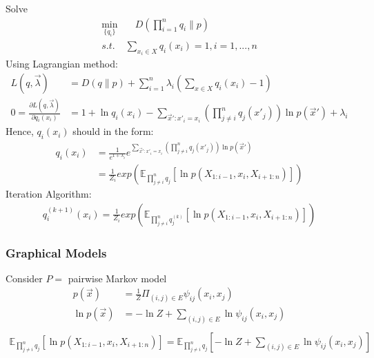 \documentclass[11pt,a4paper]{article}
\begin{document}
Solve 
\begin{equation}
    \begin{aligned}
        \min_{\{q_i\}}&\quad D(\prod_{i=1}^nq_i\| p)\\
        s.t.&\sum_{x_i\in X}q_i(x_i)=1,i=1,...,n
    \end{aligned}
    \nonumber
\end{equation}
Using Lagrangian method:
\begin{equation}
    \begin{aligned}
        L(q,\vec{\lambda})&=D(q\| p)+\sum_{i=1}^n\lambda_i\left(\sum_{x\in X}q_i(x_i)-1\right)\\
        0=\frac{\partial L(q,\vec{\lambda})}{\partial q_i(x_i)}&=1+\ln q_i(x_i)-\sum_{\vec{x}':x'_i=x_i}\left(\prod_{j\neq i}^nq_j (x'_j)\right)\ln p(\vec{x}')+\lambda_i
    \end{aligned}
    \nonumber
\end{equation}
Hence, $q_i(x_i)$ should in the form:
\begin{equation}
    \begin{aligned}
        q_i(x_i)&=\frac{1}{e^{1+\lambda_i}}e^{\sum_{\vec{x}':x'_i=x_i}\left(\prod_{j\neq i}^nq_j (x'_j)\right)\ln p(\vec{x}')}\\
        &=\frac{1}{Z_i}exp\left({\mathbb{E}_{\prod_{j\neq i}^nq_j}[\ln p(X_{1:i-1},x_i,X_{i+1:n})]}\right)
    \end{aligned}
    \nonumber
\end{equation}
Iteration Algorithm:
\begin{equation}
    \begin{aligned}
        q_i^{(k+1)}(x_i)=\frac{1}{Z_i}exp\left({\mathbb{E}_{\prod_{j\neq i}^nq_j^{(k)}}[\ln p(X_{1:i-1},x_i,X_{i+1:n})]}\right)
    \end{aligned}
    \nonumber
\end{equation}

\subsubsection{Graphical Models}
Consider $P=$ pairwise Markov model
\begin{equation}
    \begin{aligned}
        p(\vec{x})&=\frac{1}{Z}\Pi_{(i,j)\in E}\psi_{ij}(x_i,x_j)\\
        \ln p(\vec{x})&=-\ln{Z}+\sum_{(i,j)\in E}\ln\psi_{ij}(x_i,x_j)\\
    \end{aligned}
    \nonumber
\end{equation}
\begin{equation}
    \begin{aligned}
        {\mathbb{E}_{\prod_{j\neq i}^nq_j}[\ln p(X_{1:i-1},x_i,X_{i+1:n})]}=\mathbb{E}_{\prod_{j\neq i}^nq_j}[-\ln{Z}+\sum_{(i,j)\in E}\ln\psi_{ij}(x_i,x_j)]
    \end{aligned}
    \nonumber
\end{equation}
\end{document}
